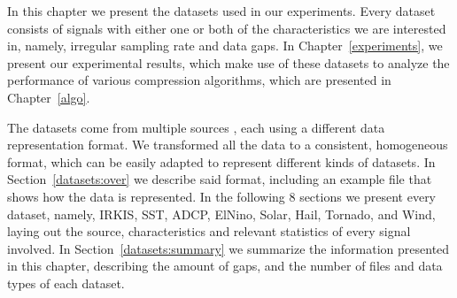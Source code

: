 






\newcommand{\dataCite}{\cite{dataset:irkis, dataset:irkis2, dataset:sst1, dataset:elnino, dataset:solar, dataset:spc}}

In this chapter we present the datasets used in our experiments. Every dataset consists of signals with either one or both of the characteristics we are interested in, namely, irregular sampling rate and data gaps. In Chapter~\ref{experiments}, we present our experimental results, which make use of these datasets to analyze the performance of various compression algorithms, which are presented in Chapter~\ref{algo}.


The datasets come from multiple sources \dataCite, each using a different data representation format. We transformed all the data to a consistent, homogeneous format, which can be easily adapted to represent different kinds of datasets. In Section~\ref{datasets:over} we describe said format, including an example file that shows how the data is represented. In the following 8 sections we present every dataset, namely, IRKIS, SST, ADCP, ElNino, Solar, Hail, Tornado, and Wind, laying out the source, characteristics and relevant statistics of every signal involved. In Section~\ref{datasets:summary} we summarize the information presented in this chapter, describing the amount of gaps, and the number of files and data types of each dataset. 

